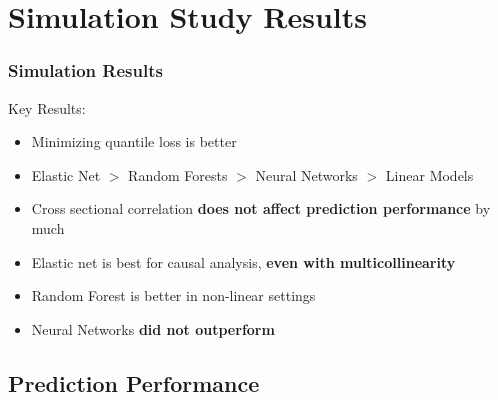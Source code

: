 \documentclass[aspectratio=169]{beamer}
\begin{document}

\section{Simulation Study Results}

\begin{frame}
\frametitle{Simulation Results}
Key Results:
\begin{itemize}
\item Minimizing quantile loss is better
\item Elastic Net $>$ Random Forests $>$ Neural Networks $>$ Linear Models
\item Cross sectional correlation \textbf{does not affect prediction performance} by much
\item Elastic net is best for causal analysis, \textbf{even with multicollinearity}
\item Random Forest is better in non-linear settings
\item Neural Networks \textbf{did not outperform}
\end{itemize}
\end{frame}

\subsection{Prediction Performance}


\end{document}
